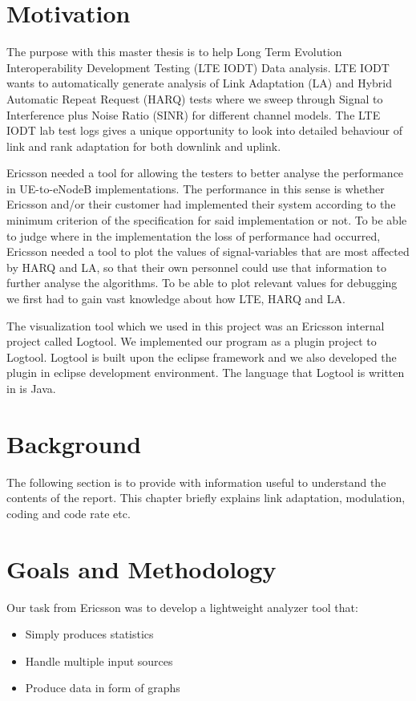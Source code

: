 \documentclass[cropmarks, frame, english]{idamasterthesis}
\begin{document}
\newpage
\section{Motivation}
The purpose with this master thesis is to help Long Term Evolution Interoperability Development Testing (LTE IODT) Data analysis. LTE IODT wants to automatically generate analysis of Link Adaptation (LA) and Hybrid Automatic Repeat Request (HARQ) tests where we sweep through Signal to Interference plus Noise Ratio (SINR) for different channel models. The LTE IODT lab test logs gives a unique opportunity to look into detailed behaviour of link and rank adaptation for both downlink and uplink. \newline

Ericsson needed a tool for allowing the testers to better analyse the performance in UE-to-eNodeB implementations. The performance in this sense is whether Ericsson and/or their customer had implemented their system according to the minimum criterion of the specification for said implementation or not. To be able to judge where in the implementation the loss of performance had occurred, Ericsson needed a tool to plot the values of signal-variables that are most affected by HARQ and LA, so that their own personnel could use that information to further analyse the algorithms. To be able to plot relevant values for debugging we first had to gain vast knowledge about how LTE, HARQ and LA. \newline

The visualization tool which we used in this project was an Ericsson internal project called Logtool. We implemented our program as a plugin project to Logtool. Logtool is built upon the eclipse framework and we also developed the plugin in eclipse development environment. The language that Logtool is written in is Java.
 
\section{Background}
The following section is to provide with information useful to understand the contents of the report. This chapter briefly explains link adaptation, modulation, coding and code rate etc.

\section{Goals and Methodology}

Our task from Ericsson was to develop a lightweight analyzer tool that:
 \begin{itemize} 
 \item Simply produces statistics
 \item Handle multiple input sources
 \item Produce data in form of graphs
 \end{itemize} 
\end{document}

